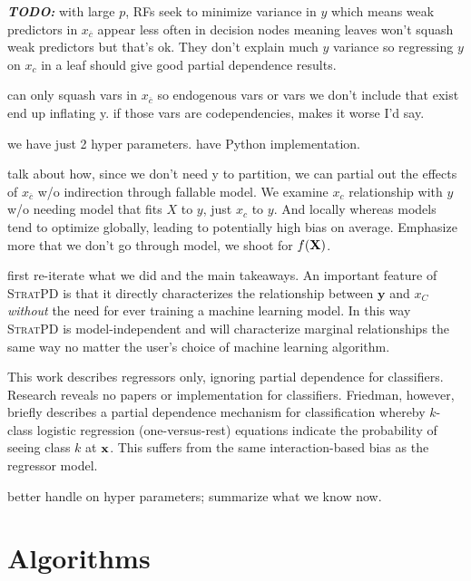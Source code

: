 \documentclass[12pt]{article}
\newcommand{\todo}[1]{{\bf\em TODO:} {{\color{red}{#1}}}}
\newcommand{\spd}{\fontfamily{cmr}\textsc{\small StratPD}}
\newcommand{\xnc}{$x_{\overline{c}}$}
\begin{document}
\todo{James: check this out!} with large $p$, RFs seek to minimize variance in $y$ which means weak predictors in \xnc{} appear less often in decision nodes meaning leaves won't squash weak predictors but that's ok. They don't explain much $y$ variance so regressing $y$ on $x_c$ in a leaf should give good partial dependence results.

can only squash vars in \xnc{} so endogenous vars or vars we don't include that exist end up inflating y. if those vars are codependencies, makes it worse I'd say.

we have just 2 hyper parameters. have Python implementation.

talk about how, since we don't need y to partition, we can partial out the effects of \xnc{} w/o indirection through fallable model.  We examine $x_c$ relationship with $y$ w/o needing model that fits $X$ to $y$, just $x_c$ to $y$. And locally whereas models tend to optimize globally, leading to potentially high bias on average. Emphasize more that we don't go through model, we shoot for $f(\bf X)$.

{\color{red} first re-iterate what we did and the main takeaways}. An important feature of \spd{} is that it directly characterizes the relationship between $\mathbf{y}$ and $x_C$ \emph{without} the need for ever training a machine learning model. In this way \spd{} is {model-independent} and will characterize marginal relationships the same way no matter the user's choice of machine learning algorithm. 

This work describes regressors only, ignoring partial dependence for classifiers.  Research reveals no papers or implementation for classifiers. Friedman, however, briefly describes a partial dependence mechanism for classification whereby $k$-class logistic regression (one-versus-rest) equations indicate the probability of seeing class $k$ at $\bf{x}$.  This suffers from the same interaction-based bias as the regressor model.

better handle on hyper parameters; summarize what we know now.

\section{Algorithms}
\end{document}
